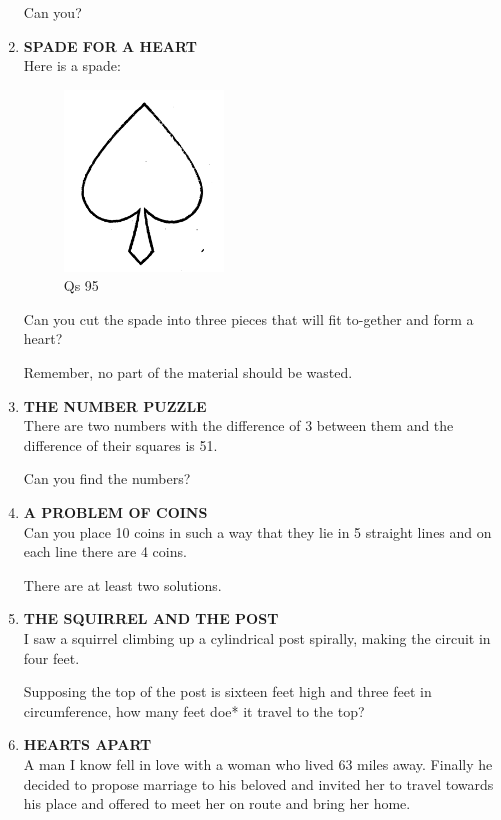 \documentclass[12pt]{article}
\begin{document}
\begin{enumerate}
Can you? 
%
\item \textbf{SPADE  FOR  A HEART} \\ 
Here  is a spade:

\begin{figure}[h]
\begin{center}
\includegraphics[width=0.4\textwidth]{images/sdevi_q95.png}
\caption{ Qs 95}
\end{center}
\end{figure}

Can you cut the spade  into  three  pieces  that  will  fit to-gether  and form  a heart? 

Remember,  no part  of the material  should  be wasted. 
%
\item \textbf{THE  NUMBER  PUZZLE} \\
There  are  two  numbers  with  the difference  of 3 between them  and  the difference  of their  squares  is 51. 

Can you  find  the numbers? 
%
\item \textbf{A  PROBLEM  OF COINS} \\ 
Can you  place  10 coins  in such  a way  that  they  lie in 5 straight  lines  and on each  line  there  are 4 coins. 

There  are at least  two  solutions. 
%
\item \textbf{THE  SQUIRREL  AND  THE  POST} \\
I saw  a squirrel  climbing  up a cylindrical  post  spirally, making  the circuit  in four  feet. 

Supposing  the  top  of the post  is sixteen  feet high  and three  feet  in circumference,  how  many  feet doe*  it travel to the top? 
%
\item \textbf{HEARTS  APART} \\
A man  I know  fell  in love  with  a woman  who  lived  63 miles  away.  Finally  he decided  to propose  marriage  to his beloved  and invited  her to travel  towards  his place  and offered  to meet  her on route  and bring  her home. 


\end{enumerate}
\end{document}
